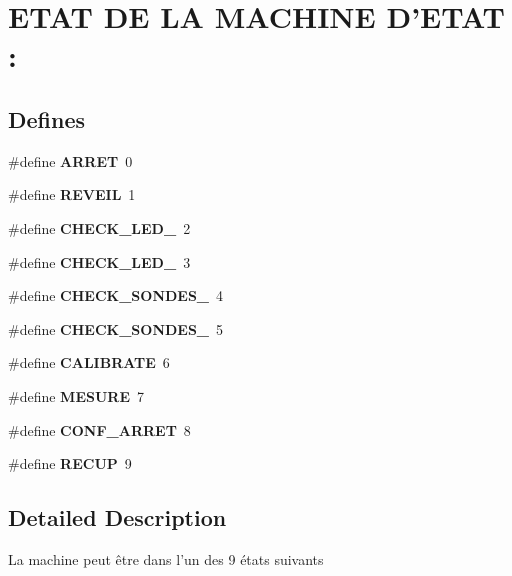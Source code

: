 \hypertarget{group__group1}{
\section{ETAT DE LA MACHINE D'ETAT :}
\label{group__group1}
}
\subsection*{Defines}
\begin{DoxyCompactItemize}
\item 
\hypertarget{group__group1_ga7cb924f3da4013624784dbc36644083f}{
\#define {\bfseries ARRET}~0}
\label{group__group1_ga7cb924f3da4013624784dbc36644083f}

\item 
\hypertarget{group__group1_ga176abbe913ad9c4c90e15831ebec36c8}{
\#define {\bfseries REVEIL}~1}
\label{group__group1_ga176abbe913ad9c4c90e15831ebec36c8}

\item 
\hypertarget{group__group1_gac060c40b9111fcfb2c80986ac6915d67}{
\#define {\bfseries CHECK\_\-LED\_}~2}
\label{group__group1_gac060c40b9111fcfb2c80986ac6915d67}

\item 
\hypertarget{group__group1_ga2c1c5f28e6d5446920de121ef36b84d3}{
\#define {\bfseries CHECK\_\-LED\_}~3}
\label{group__group1_ga2c1c5f28e6d5446920de121ef36b84d3}

\item 
\hypertarget{group__group1_ga73ea80446fb22b1eb6ca6bb8d1529204}{
\#define {\bfseries CHECK\_\-SONDES\_}~4}
\label{group__group1_ga73ea80446fb22b1eb6ca6bb8d1529204}

\item 
\hypertarget{group__group1_gae670770d69af4a01b6614bcad9965890}{
\#define {\bfseries CHECK\_\-SONDES\_}~5}
\label{group__group1_gae670770d69af4a01b6614bcad9965890}

\item 
\hypertarget{group__group1_gadacf4c0ec79d1e8779e6bad70ddf1ee9}{
\#define {\bfseries CALIBRATE}~6}
\label{group__group1_gadacf4c0ec79d1e8779e6bad70ddf1ee9}

\item 
\hypertarget{group__group1_gaefb9f869cdf6b084edc3a43a9aacb7cb}{
\#define {\bfseries MESURE}~7}
\label{group__group1_gaefb9f869cdf6b084edc3a43a9aacb7cb}

\item 
\hypertarget{group__group1_ga43f56e63a834be496ec028d889be54b6}{
\#define {\bfseries CONF\_\-ARRET}~8}
\label{group__group1_ga43f56e63a834be496ec028d889be54b6}

\item 
\hypertarget{group__group1_gaf35d9fce5f5093cca0528ed6fda3d4df}{
\#define {\bfseries RECUP}~9}
\label{group__group1_gaf35d9fce5f5093cca0528ed6fda3d4df}

\end{DoxyCompactItemize}


\subsection{Detailed Description}
La machine peut être dans l'un des 9 états suivants 